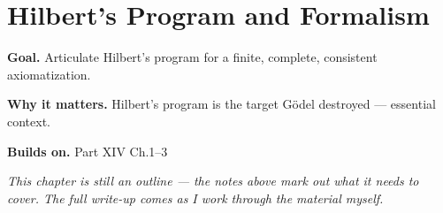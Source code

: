 \chapter{Hilbert's Program and Formalism}
\label{ch:14-metamathematics-04}

\begin{chapterintro}
\textbf{Goal.} Articulate Hilbert's program for a finite, complete, consistent axiomatization.

\textbf{Why it matters.} Hilbert's program is the target Gödel destroyed — essential context.

\textbf{Builds on.} Part XIV Ch.1–3
\end{chapterintro}

\textit{This chapter is still an outline --- the notes above mark out what it needs to cover. The full write-up comes as I work through the material myself.}
